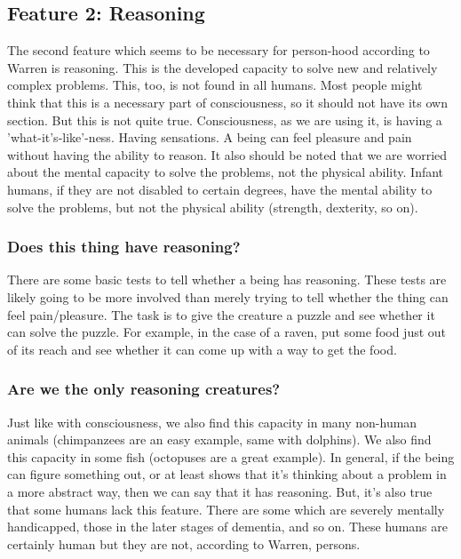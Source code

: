 \subsection{Feature 2: Reasoning}

The second feature which seems to be necessary for person-hood according to Warren is reasoning. This is the developed capacity to solve new and relatively complex problems. This, too, is not found in all humans. Most people might think that this is a necessary part of consciousness, so it should not have its own section. But this is not quite true. Consciousness, as we are using it, is having a 'what-it's-like'-ness. Having sensations. A being can feel pleasure and pain without having the ability to reason. It also should be noted that we are worried about the mental capacity to solve the problems, not the physical ability. Infant humans, if they are not disabled to certain degrees, have the mental ability to solve the problems, but not the physical ability (strength, dexterity, so on).

\subsubsection{Does this thing have reasoning?}

There are some basic tests to tell whether a being has reasoning. These tests are likely going to be more involved than merely trying to tell whether the thing can feel pain/pleasure. The task is to give the creature a puzzle and see whether it can solve the puzzle. For example, in the case of a raven, put some food just out of its reach and see whether it can come up with a way to get the food.  

\subsubsection{Are we the only reasoning creatures?}

Just like with consciousness, we also find this capacity in many non-human animals (chimpanzees are an easy example, same with dolphins). We also find this capacity in some fish (octopuses are a great example). In general, if the being can figure something out, or at least shows that it's thinking about a problem in a more abstract way, then we can say that it has reasoning. But, it's also true that some humans lack this feature. There are some which are severely mentally handicapped, those in the later stages of dementia, and so on. These humans are certainly human but they are not, according to Warren, persons.

